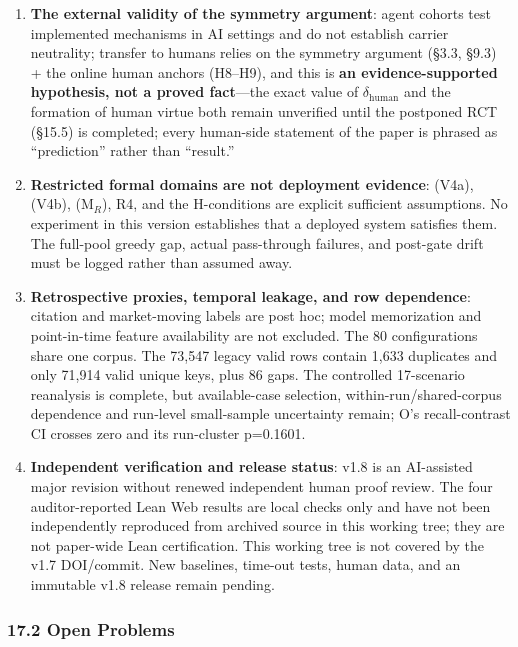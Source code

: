 \documentclass[
  11pt]{article}
\begin{document}
\begin{enumerate}
  zero-recruitment checklist see the Supplementary Material.
\item
  \textbf{The external validity of the symmetry argument}: agent cohorts
  test implemented mechanisms in AI settings and do not establish
  carrier neutrality; transfer to humans relies on the symmetry argument
  (§3.3, §9.3) + the online human anchors (H8--H9), and this is
  \textbf{an evidence-supported hypothesis, not a proved fact}---the
  exact value of \(\delta_{\mathrm{human}}\) and the formation of human
  virtue both remain unverified until the postponed RCT (§15.5) is
  completed; every human-side statement of the paper is phrased as
  ``prediction'' rather than ``result.''
\item
  \textbf{Restricted formal domains are not deployment evidence}: (V4a),
  (V4b), (M\(_R\)), R4, and the H-conditions are explicit sufficient
  assumptions. No experiment in this version establishes that a deployed
  system satisfies them. The full-pool greedy gap, actual pass-through
  failures, and post-gate drift must be logged rather than assumed away.
\item
  \textbf{Retrospective proxies, temporal leakage, and row dependence}:
  citation and market-moving labels are post hoc; model memorization and
  point-in-time feature availability are not excluded. The 80
  configurations share one corpus. The 73,547 legacy valid rows contain
  1,633 duplicates and only 71,914 valid unique keys, plus 86 gaps. The
  controlled 17-scenario reanalysis is complete, but available-case
  selection, within-run/shared-corpus dependence and run-level
  small-sample uncertainty remain; O's recall-contrast CI crosses zero
  and its run-cluster p=0.1601.
\item
  \textbf{Independent verification and release status}: v1.8 is an
  AI-assisted major revision without renewed independent human proof
  review. The four auditor-reported Lean Web results are local checks
  only and have not been independently reproduced from archived source
  in this working tree; they are not paper-wide Lean certification. This
  working tree is not covered by the v1.7 DOI/commit. New baselines,
  time-out tests, human data, and an immutable v1.8 release remain
  pending.
\end{enumerate}

\subsubsection{17.2 Open Problems}\label{open-problems}
\end{document}

